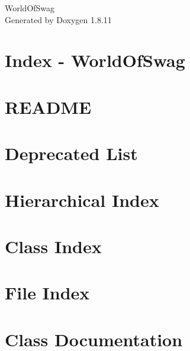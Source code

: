 \documentclass[twoside]{book}
\newcommand{\+}{\discretionary{\mbox{\scriptsize$\hookleftarrow$}}{}{}}
\newcommand{\clearemptydoublepage}{%
  \newpage{\pagestyle{empty}\cleardoublepage}%
}
\begin{document}
\hypersetup{pageanchor=false,
             bookmarksnumbered=true,
             pdfencoding=unicode
            }
\begin{titlepage}
\vspace*{7cm}
\begin{center}%
{\Large World\+Of\+Swag }\\
\vspace*{1cm}
{\large Generated by Doxygen 1.8.11}\\
\end{center}
\end{titlepage}
\clearemptydoublepage
\tableofcontents
\clearemptydoublepage
{}
\hypersetup{pageanchor=true}

\chapter{Index -\/ World\+Of\+Swag}
\label{index}\hypertarget{index}{}
\chapter{R\+E\+A\+D\+ME}
\label{md_README}
\hypertarget{md_README}{}

\chapter{Deprecated List}
\label{deprecated}
\hypertarget{deprecated}{}

\chapter{Hierarchical Index}

\chapter{Class Index}

\chapter{File Index}

\chapter{Class Documentation}




























\end{document}
